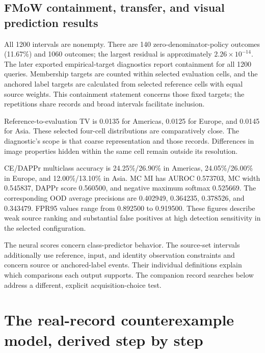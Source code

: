 \documentclass[11pt,a4paper]{report}
\newcommand{\code}[1]{\texttt{\detokenize{#1}}}
\begin{document}
\section{FMoW containment, transfer, and visual prediction results}
All 1200 intervals are nonempty. There are 140 zero-denominator-policy outcomes (11.67\%) and 1060 \code{ok} outcomes; the largest residual is approximately $2.26\times10^{-14}$. The later exported empirical-target diagnostics report containment for all 1200 queries. Membership targets are counted within selected evaluation cells, and the anchored label targets are calculated from selected reference cells with equal source weights. This containment statement concerns those fixed targets; the repetitions share records and broad intervals facilitate inclusion.

Reference-to-evaluation TV is 0.0135 for Americas, 0.0125 for Europe, and 0.0145 for Asia. These selected four-cell distributions are comparatively close. The diagnostic's scope is that coarse representation and those records. Differences in image properties hidden within the same cell remain outside its resolution.

CE/DAPPr multiclass accuracy is 24.25\%/26.90\% in Americas, 24.05\%/26.00\% in Europe, and 12.00\%/13.10\% in Asia. MC MI has AUROC 0.573703, MC width 0.545837, DAPPr score 0.560500, and negative maximum softmax 0.525669. The corresponding OOD average precisions are 0.402949, 0.364235, 0.378526, and 0.343479. FPR95 values range from 0.892500 to 0.919500. These figures describe weak source ranking and substantial false positives at high detection sensitivity in the selected configuration.

The neural scores concern class-predictor behavior. The source-set intervals additionally use reference, input, and identity observation constraints and concern source or anchored-label events. Their individual definitions explain which comparisons each output supports. The companion record searches below address a different, explicit acquisition-choice test.

\chapter{The real-record counterexample model, derived step by step}
\end{document}

